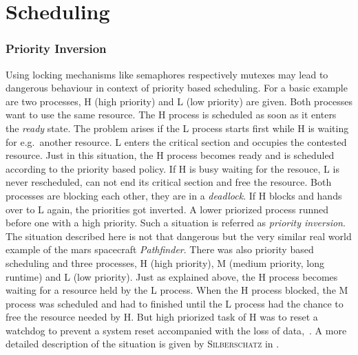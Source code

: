 %

\section{Scheduling}\label{sec:scheduling}


\subsubsection*{Priority Inversion}
Using locking mechanisms like semaphores respectively mutexes may lead to dangerous behaviour in context of priority based scheduling.
For a basic example are two processes, H (high priority) and L (low priority) are given.
Both processes want to use the same resource.
The H process is scheduled as soon as it enters the \textit{ready} state.
The problem arises if the L process starts first while H is waiting for e.g.\ another resource.
L enters the critical section and occupies the contested resource.
Just in this situation, the H process becomes ready and is scheduled according to the priority based policy.
If H is busy waiting for the resouce, L is never rescheduled, can not end its critical section and free the resource\cite{tanenbaum-modern-operating-systems}.
Both processes are blocking each other, they are in a \textit{deadlock}\cite{glatz2015betriebssysteme}.
If H blocks and hands over to L again, the priorities got inverted.
A lower priorized process runned before one with a high priority.
Such a situation is referred as \textit{priority inversion}\cite{tanenbaum-modern-operating-systems}.
The situation described here is not that dangerous but the very similar real world example of the mars spacecraft \textit{Pathfinder}.
There was also priority based scheduling and three processes, H (high priority), M (medium priority, long runtime) and L (low priority).
Just as explained above, the H process becomes waiting for a resource held by the L process. 
When the H process blocked, the M process was scheduled and had to finished until the L process had the chance to free the resource needed by H.
But high priorized task of H was to reset a watchdog to prevent a system reset accompanied with the loss of data\cite{glatz2015betriebssysteme},~\cite{silberschatz2009operating}.
A more detailed description of the situation is given by \textsc{Silberschatz} in \cite{silberschatz2009operating}.

